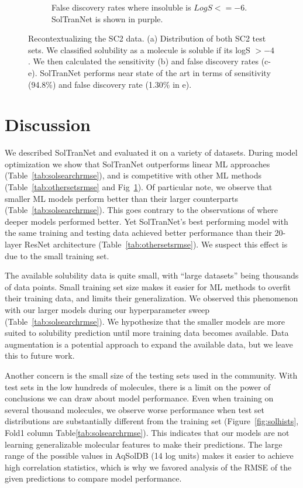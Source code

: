 \documentclass[journal=jcim,manuscript=applicationnotes]{achemso}
\begin{document}
\begin{figure}[tb]
\begin{subfigure}[t]{0.32\textwidth}
        \caption{False discovery rates where insoluble is $LogS <=-6$. SolTranNet is shown in purple.}
    \end{subfigure}
    \caption{Recontextualizing the SC2 data. (a) Distribution of both SC2 test sets. We classified solubility as a molecule is soluble if its logS $> -4$. We then calculated the sensitivity (b) and false discovery rates (c-e). SolTranNet performs near state of the art in terms of sensitivity (94.8\%) and false discovery rate (1.30\% in e).}
    \label{fig:sc2redo}
\end{figure}

\section{Discussion}

We described SolTranNet and evaluated it on a variety of datasets.
During model optimization we show that SolTranNet outperforms linear ML approaches (Table~\ref{tab:solsearchrmse}), and is competitive with other ML methods (Table~\ref{tab:othersetsrmse} and Fig~\ref{fig:sc2redo}).
Of particular note, we observe that smaller ML models perform better than their larger counterparts (Table~\ref{tab:solsearchrmse}).
This goes contrary to the observations of \citet{cui} where deeper models performed better.
Yet SolTranNet's best performing model with the same training and testing data achieved better performance than their 20-layer ResNet architecture \cite{cui} (Table~\ref{tab:othersetsrmse}).
We suspect this effect is due to the small training set.

The available solubility data is quite small, with ``large datasets'' being thousands of data points.
Small training set size makes it easier for ML methods to overfit their training data, and limits their generalization.
We observed this phenomenon with our larger models during our hyperparameter sweep (Table~\ref{tab:solsearchrmse}).
We hypothesize that the smaller models are more suited to solubility prediction until more training data becomes available.
Data augmentation is a potential approach to expand the available data, but we leave this to future work.

Another concern is the small size of the testing sets used in the community.
With test sets in the low hundreds of molecules, there is a limit on the power of conclusions we can draw about model performance.
Even when training on several thousand molecules, we observe worse performance when test set distributions are substantially different from the training set (Figure~\ref{fig:solhists}, Fold1 column Table\ref{tab:solsearchrmse}).
This indicates that our models are not learning generalizable molecular features to make their predictions.
The large range of the possible values in AqSolDB (14 log units) makes it easier to achieve high correlation statistics, which is why we favored analysis of the RMSE of the given predictions to compare model performance.
\end{document}
